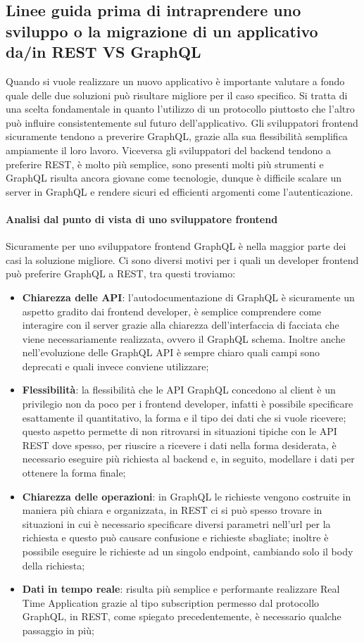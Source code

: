 \subsection{Linee guida prima di intraprendere uno sviluppo o la migrazione di un applicativo da/in REST VS GraphQL}
Quando si vuole realizzare un nuovo applicativo è importante valutare a fondo quale delle due soluzioni può risultare migliore per il caso specifico. Si tratta di una scelta fondamentale in quanto l'utilizzo di un protocollo piuttosto che l'altro può influire consistentemente sul futuro dell'applicativo. Gli sviluppatori frontend sicuramente tendono a preverire GraphQL, grazie alla sua flessibilità semplifica ampiamente il loro lavoro. Viceversa gli sviluppatori del backend tendono a preferire REST, è molto più semplice, sono presenti molti più strumenti e GraphQL risulta ancora giovane come tecnologie, dunque è difficile scalare un server in GraphQL e rendere sicuri ed efficienti argomenti come l'autenticazione.
\paragraph{Analisi dal punto di vista di uno sviluppatore frontend}
Sicuramente per uno sviluppatore frontend GraphQL è nella maggior parte dei casi la soluzione migliore. Ci sono diversi motivi per i quali un developer frontend può preferire GraphQL a REST, tra questi troviamo:
\begin{itemize}
  \item \textbf{Chiarezza delle API}: l'autodocumentazione di GraphQL è sicuramente un aspetto gradito dai frontend developer, è semplice comprendere come interagire con il server grazie alla chiarezza dell'interfaccia di facciata che viene necessariamente realizzata, ovvero il GraphQL schema. Inoltre anche nell'evoluzione delle GraphQL API è sempre chiaro quali campi sono deprecati e quali invece conviene utilizzare;
  \item \textbf{Flessibilità}: la flessibilità che le API GraphQL concedono al client è un privilegio non da poco per i frontend developer, infatti è possibile specificare esattamente il quantitativo, la forma e il tipo dei dati che si vuole ricevere; questo aspetto permette di non ritrovarsi in situazioni tipiche con le API REST dove spesso, per riuscire a ricevere i dati nella forma desiderata, è necessario eseguire più richiesta al backend e, in seguito, modellare i dati per ottenere la forma finale;
  \item \textbf{Chiarezza delle operazioni}: in GraphQL le richieste vengono costruite in maniera più chiara e organizzata, in REST ci si può spesso trovare in situazioni in cui è necessario specificare diversi parametri nell'url per la richiesta e questo può causare confusione e richieste sbagliate; inoltre è possibile eseguire le richieste ad un singolo endpoint, cambiando solo il body della richiesta;
  \item \textbf{Dati in tempo reale}: risulta più semplice e performante realizzare Real Time Application grazie al tipo subscription permesso dal protocollo GraphQL, in REST, come spiegato precedentemente, è necessario qualche passaggio in più;
\end{itemize}

